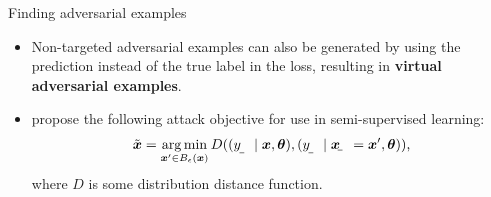 \documentclass{beamer}
\newcommand{\citet}[1]{{\color{citecolor}\relscale{0.8}\textcite{#1}}}
\begin{document}
\begin{frame}[allowframebreaks=0.9]{Finding adversarial examples}
\begin{itemize}
	\item Non-targeted adversarial examples can also be generated by using the prediction instead of the true label in the loss, resulting in \textbf{virtual adversarial examples}.	
	\item \citet{Miyato:2017:VATRMSSSL,Kurakin:2016:AMLS} propose the following attack objective for use in semi-supervised learning:
	\begin{align}
	\tilde{\vec x} = \argmin_{\vec x'\in B_\epsilon(\vec x)} D((\rvar y\mid \vec x, \vec\theta), (\rvar y\mid \rvec x = \vec x', \vec\theta)) \text{,}
	\end{align}
	where $D$ is some distribution distance function.
\end{itemize}
\end{frame}
\end{document}
